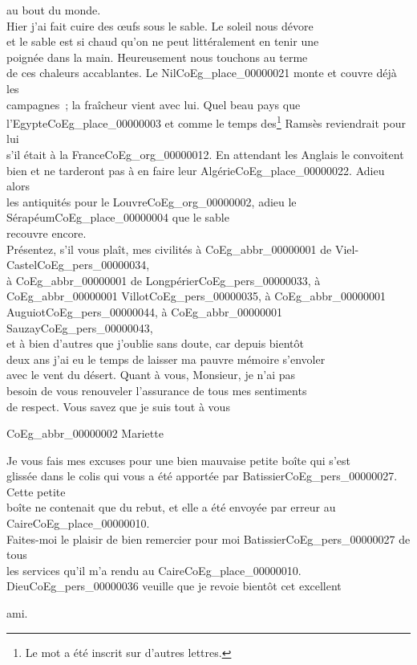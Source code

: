 \documentclass{book}
\begin{document}
au bout du monde.\\
\indent Hier j’ai fait cuire des œufs sous le sable. Le soleil nous dévore\\
et le sable est si chaud qu’on ne peut littéralement en tenir une\\
poignée dans la main. Heureusement nous touchons au terme\\
de ces chaleurs accablantes. Le Nil\gls{CoEg_place_00000021} monte et couvre déjà les\\
campagnes~; la fraîcheur vient avec lui. Quel beau pays que\\
l’Egypte\gls{CoEg_place_00000003} et comme le temps des\footnote{Le mot a été inscrit sur d'autres lettres.} Ramsès reviendrait pour lui\\
s’il était à la France\gls{CoEg_org_00000012}. En attendant les Anglais le convoitent\\
bien et ne tarderont pas à en faire leur Algérie\gls{CoEg_place_00000022}. Adieu alors\\
les antiquités pour le Louvre\gls{CoEg_org_00000002}, adieu le Sérapéum\gls{CoEg_place_00000004} que le sable\\
recouvre encore.\\
\indent Présentez, s’il vous plaît, mes civilités à \gls{CoEg_abbr_00000001} de Viel-Castel\gls{CoEg_pers_00000034},\\
à \gls{CoEg_abbr_00000001} de Longpérier\gls{CoEg_pers_00000033}, à \gls{CoEg_abbr_00000001} Villot\gls{CoEg_pers_00000035}, à \gls{CoEg_abbr_00000001} Auguiot\gls{CoEg_pers_00000044}, à \gls{CoEg_abbr_00000001} Sauzay\gls{CoEg_pers_00000043},\\
et à bien d’autres que j’oublie sans doute, car depuis bientôt\\
deux ans j’ai eu le temps de laisser ma pauvre mémoire s’envoler\\
avec le vent du désert. Quant à vous, Monsieur, je n’ai pas\\
besoin de vous renouveler l’assurance de tous mes sentiments\\
de respect. Vous savez que je suis tout à vous
\begin{center} \hspace{5cm}\gls{CoEg_abbr_00000002} Mariette\end{center}
Je vous fais mes excuses pour une bien mauvaise petite boîte qui s’est\\
glissée dans le colis qui vous a été apportée par Batissier\gls{CoEg_pers_00000027}. Cette petite\\
boîte ne contenait que du rebut, et elle a été envoyée par erreur au\\
Caire\gls{CoEg_place_00000010}.\\
\indent Faites-moi le plaisir de bien remercier pour moi Batissier\gls{CoEg_pers_00000027} de tous\\
les services qu’il m’a rendu au Caire\gls{CoEg_place_00000010}. Dieu\gls{CoEg_pers_00000036} veuille que je revoie bientôt cet excellent
\begin{flushright}ami.\end{flushright}
\hypertarget{CoEg_Mariette_1852-08-20}{}
\end{document}
